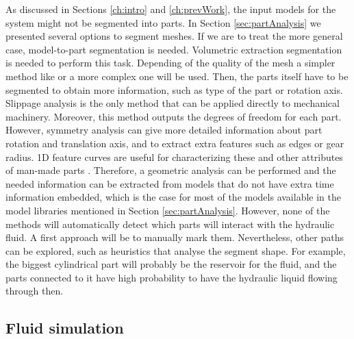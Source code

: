 As discussed in Sections \ref{ch:intro} and \ref{ch:prevWork}, the input models for the system might not be segmented into parts.
In Section \ref{sec:partAnalysis} we presented several options to segment meshes.
If we are to treat the more general case, model-to-part segmentation is needed.
Volumetric extraction segmentation is needed to perform this task.
Depending of the quality of the mesh a simpler method like \cite{Attene2006} or a more complex one \cite{Yumer2012} will be used.
Then, the parts itself have to be segmented to obtain more information, such as type of the part or rotation axis.
Slippage analysis \cite{Yi2014} is the only method that can be applied directly to mechanical machinery.
Moreover, this method outputs the degrees of freedom for each part.
However, symmetry analysis \cite{Mitra2007} can give more detailed information about part rotation and translation axis, and to extract extra features such as edges or gear radius.
1D feature curves are useful for characterizing these and other attributes of man-made parts \cite{Gal2009}.
Therefore, a geometric analysis can be performed and the needed information can be extracted from models that do not have extra time information embedded, which is the case for most of the models available in the model libraries mentioned in Section \ref{sec:partAnalysis}.
However, none of the methods will automatically detect which parts will interact with the hydraulic fluid.
A first approach will be to manually mark them.
Nevertheless, other paths can be explored, such as heuristics that analyse the segment shape.
For example, the biggest cylindrical part will probably be the reservoir for the fluid, and the parts connected to it have high probability to have the hydraulic liquid flowing through then.


\subsection{Fluid simulation}


